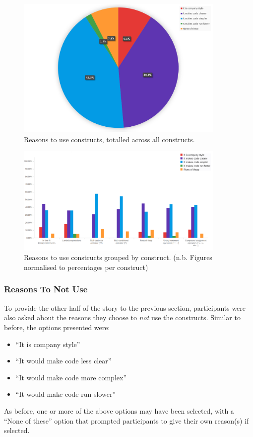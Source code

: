 \documentclass{article}
\begin{document}
            \begin{figure}[htbp]
                \centering
                \includegraphics[width=0.9\textwidth]{toUsePie}
                \caption{Reasons to use constructs, totalled across all constructs.}
                \label{fig:toUsePie}
            \end{figure}
            \begin{figure}[htbp]
                \centering
                \includegraphics[width=0.9\textwidth]{toUse}
                \caption{Reasons to use constructs grouped by construct. (n.b. Figures normalised to percentages per construct)}
                \label{fig:toUse}
            \end{figure}

        \subsubsection{Reasons To Not Use}
            To provide the other half of the story to the previous section, participants were also asked about the reasons they choose to \emph{not} use the constructs. Similar to before, the options presented were:
            \begin{itemize}
                \item ``It is company style''
                \item ``It would make code less clear''
                \item ``It would make code more complex''
                \item ``It would make code run slower''
            \end{itemize}
            As before, one or more of the above options may have been selected, with a ``None of these'' option that prompted participants to give their own reason(s) if selected.
            \newline
\end{document}
